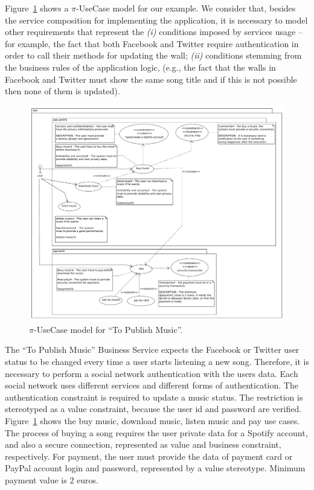 \documentclass{singlecol-new}
\theoremstyle{TH}{
\newtheorem{lemma}{Lemma}
\newtheorem{theorem}[lemma]{Theorem}
\newtheorem{corrolary}[lemma]{Corrolary}
\newtheorem{conjecture}[lemma]{Conjecture}
\newtheorem{proposition}[lemma]{Proposition}
\newtheorem{claim}[lemma]{Claim}
\newtheorem{stheorem}[lemma]{Wrong Theorem}
\newtheorem{algorithm}{Algorithm}
}
\theoremstyle{THrm}{
\newtheorem{definition}{Definition}[section]
\newtheorem{question}{Question}[section]
\newtheorem{remark}{Remark}
\newtheorem{scheme}{Scheme}
}
\theoremstyle{THhit}{
\newtheorem{case}{Case}[section]
}
\theoremstyle{THhsl}{
\newtheorem{example}{Example}
}
\begin{document}
\begin{example}\label{ex:toPublicMusic2}
Figure~\ref{fig:CIM:piusecasetpm} shows a $\pi$-UseCase model for our example.
We consider that, besides the service composition for implementing the application, it is necessary to model  other requirements that represent the \textit{(i)} conditions imposed by services usage -- for example, the fact that both Facebook and Twitter require authentication in order to call their methods for updating the wall; \textit{(ii)}  conditions stemming from the business rules of the application logic, (e.g., the fact that the walls in Facebook and Twitter must show the same song title and if this is not possible then none of them is updated).

\begin{figure}[h]
\center
\includegraphics[width=1\textwidth]{./figures/UseCase.pdf}
\caption{\label{fig:CIM:piusecasetpm} $\pi$-UseCase model for ``To Publish Music''.}
\end{figure}

The ``To Publish Music'' Business Service expects  the Facebook or Twitter user status to be changed every time a user starts listening a new song.
Therefore, it is necessary to perform a social network authentication with the users data. Each social network uses different services and different forms of authentication. The authentication constraint is required to update a music status. 
The restriction is stereotyped as a value constraint, because the user id and password are verified.  
Figure~\ref{fig:CIM:piusecasetpm} shows the buy music, download music, listen music and pay use cases. 
The process of buying a song requires the user private data for a Spotify account, and also a secure connection, represented as value and business constraint, respectively. 
For payment, the user must provide the data of payment card or PayPal account login and password, represented by a value stereotype.
Minimum payment value is 2 euros.
\end{example}
\end{document}
